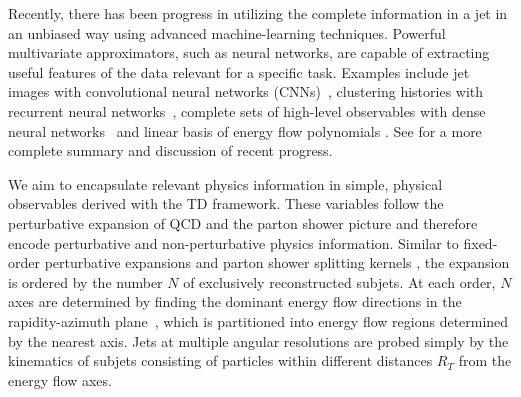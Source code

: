 \documentclass[notoc,preprintnumbers]{JHEP3}
\begin{document}
Recently, there has been progress in utilizing the complete information in a jet in an unbiased way using advanced machine-learning techniques. Powerful multivariate approximators, such as neural networks, are capable of extracting useful features of the data relevant for a specific task. Examples include jet images with convolutional neural networks (CNNs)~\cite{Cogan:2014oua,deOliveira:2015xxd,Komiske:2016rsd,Kasieczka:2017nvn}, clustering histories with recurrent neural networks~\cite{Louppe:2017ipp}, complete sets of high-level observables with dense neural networks~\cite{Datta:2017rhs,Datta:2017lxt,Aguilar-Saavedra:2017rzt} and linear basis of energy flow polynomials \cite{Komiske:2017aww}. See \cite{Larkoski:2017jix} for a more complete summary and discussion of recent progress.

We aim to encapsulate relevant physics information in simple, physical observables derived with the TD framework. These variables follow the perturbative expansion of QCD and the parton shower picture and therefore encode perturbative and non-perturbative physics information. Similar to fixed-order perturbative expansions and parton shower splitting kernels \cite{Nagy:2017ggp}, the expansion is ordered by the number $N$ of exclusively reconstructed subjets. At each order, $N$ axes are determined by finding the dominant energy flow directions in the rapidity-azimuth plane~\cite{Stewart:2010tn,Chien:2013kca,Stewart:2015waa,Thaler:2015xaa}, which is partitioned into energy flow regions determined by the nearest axis. Jets at multiple angular resolutions are probed simply by the kinematics of subjets consisting of particles within different distances $R_T$ from the energy flow axes.
\end{document}
